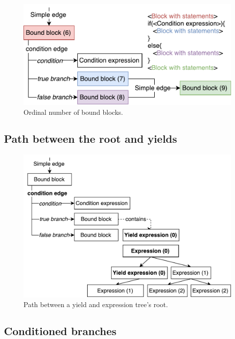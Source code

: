\begin{figure}[h]
	\centering	
	\includegraphics[scale=0.75]{../img/5_3_blockOrdinal}	
	\caption{Ordinal number of bound blocks.}
	\label{fig5.3:BlocksOrdinal}
\end{figure}

\subsection{Path between the root and yields}

\begin{figure}[h]
	\centering	
	\includegraphics[scale=0.75]{../img/5_3_path}	
	\caption{Path between a yield and expression tree's root.}
	\label{fig5.3:Path}
\end{figure}

\subsection{Conditioned branches}

